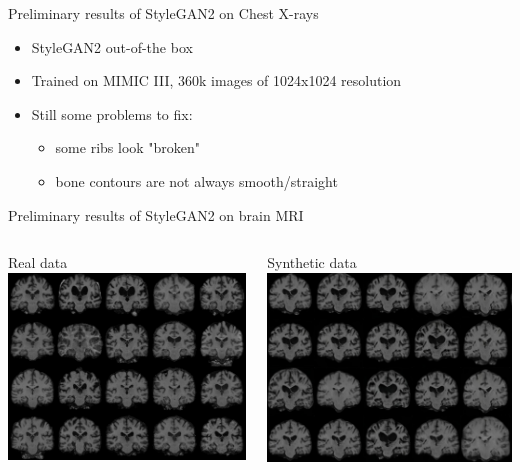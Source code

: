 \documentclass[8pt,xcolor=table,aspectratio=169]{beamer}
\begin{document}
\begin{frame}{Preliminary results of StyleGAN2 on Chest X-rays}
\begin{itemize}
\item StyleGAN2 out-of-the box
\item Trained on MIMIC III, 360k images of 1024x1024 resolution
\item Still some problems to fix:
  \begin{itemize}
  \item some ribs look "broken"
  \item bone contours are not always smooth/straight
  \end{itemize}
\end{itemize}
\vspace{1em}

\end{frame}

\begin{frame}{Preliminary results of StyleGAN2 on brain MRI}
\begin{columns}
\begin{column}{0.45\textwidth}
\centering
Real data
\includegraphics[width=\textwidth]{samY1tk.jpg}
\end{column}
\begin{column}{0.45\textwidth}
\centering
Synthetic data
\includegraphics[width=\textwidth]{JvsDI4X.jpg} 

\end{column}
\end{columns}
\end{frame}
\end{document}
